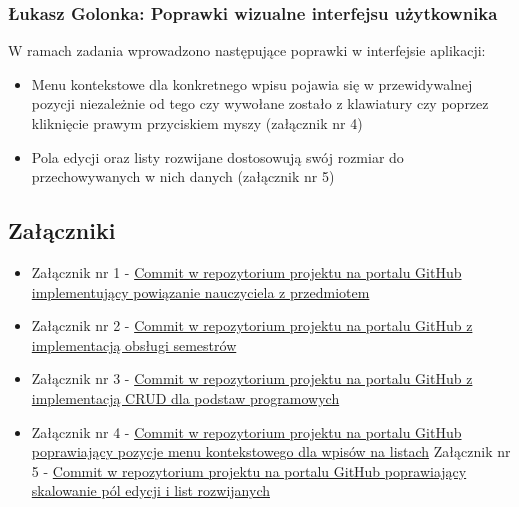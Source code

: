 \documentclass[12pt,a4paper,oneside]{article}
\theoremstyle{definition}
\numberwithin{equation}{section}
\begin{document}
\subsubsection{Łukasz Golonka: Poprawki wizualne interfejsu użytkownika}
W ramach zadania wprowadzono następujące poprawki w interfejsie aplikacji:
\begin{itemize}
	\item Menu kontekstowe dla konkretnego wpisu pojawia się w przewidywalnej pozycji niezależnie od tego czy wywołane zostało z klawiatury czy poprzez kliknięcie prawym przyciskiem myszy (załącznik nr 4)
	\item Pola edycji oraz listy rozwijane dostosowują swój rozmiar do przechowywanych w nich danych (załącznik nr 5)
\end{itemize}

\subsection{Załączniki}
\begin{itemize}
	\item Załącznik nr 1 - \href{https://github.com/lukaszgo1/engineering_project_2022/commit/4c754ff6c08ed0f98e2afc651e4a0fb9a90e8ebb}{Commit w repozytorium projektu na portalu GitHub implementujący powiązanie nauczyciela z przedmiotem}
	\item Załącznik nr 2 - \href{https://github.com/lukaszgo1/engineering_project_2022/commit/262f814cbd75357a4826d24ac012a3700cf0ac42}{Commit w repozytorium projektu na portalu GitHub z implementacją obsługi semestrów}
	\item Załącznik nr 3 - \href{https://github.com/lukaszgo1/engineering_project_2022/commit/20885c7968ac63397e992440f603a95d663774bc}{Commit w repozytorium projektu na portalu GitHub z implementacją CRUD dla podstaw programowych}
	\item Załącznik nr 4 - \href{https://github.com/lukaszgo1/engineering_project_2022/commit/d96936ff05b24bcf432032242fa521ec3b7bdddf}{Commit w repozytorium projektu na portalu GitHub poprawiający pozycje menu kontekstowego dla  wpisów na listach}
	Załącznik nr 5 - \href{https://github.com/lukaszgo1/engineering_project_2022/commit/f0e40f20c2f7e1a087646536adce1b653b1e70ff}{Commit w repozytorium projektu na portalu GitHub poprawiający skalowanie pól edycji i list rozwijanych}
\end{itemize}
\end{document}
